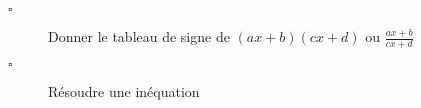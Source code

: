 \begin{titre}

\end{titre}


\begin{CpsCol}
\begin{description}
\item[$\square$] Donner le tableau de signe de $(ax + b)(cx+d)$ ou $\frac{ax + b}{cx+d}$
\item[$\square$] Résoudre une inéquation
\end{description}
\end{CpsCol}


 
 
 




